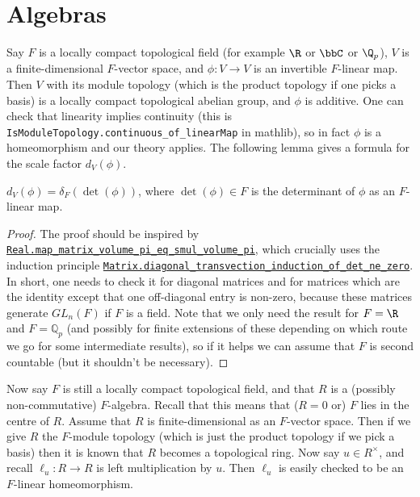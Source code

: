 \section{Algebras}

  Say $F$ is a locally compact topological field (for example $\R$ or $\bbC$ or $\Q_p$), $V$
  is a finite-dimensional $F$-vector space, and $\phi:V\to V$ is an invertible $F$-linear map.
  Then $V$ with its module topology (which is the product topology if one picks a basis)
  is a locally compact topological abelian group, and $\phi$ is additive.
  One can check that linearity implies continuity (this is {\tt IsModuleTopology.continuous\_of\_linearMap} in mathlib),
  so in fact $\phi$ is a homeomorphism
  and our theory applies. The following lemma gives a formula for the scale factor $d_V(\phi)$.

\begin{lemma}
  \label{MeasureTheory.addEquivAddHaarChar_eq_ringHaarChar_det}
  \leanok
  $d_V(\phi)=\delta_F(\det(\phi))$, where $\det(\phi)\in F$ is the determinant of $\phi$ as an $F$-linear map.
\end{lemma}
\begin{proof}
The proof should be inspired by \href{https://leanprover-community.github.io/mathlib4\_docs/Mathlib/MeasureTheory/Measure/Lebesgue/Basic.html\#Real.map\_matrix\_volume\_pi\_eq\_smul\_volume\_pi}{\tt Real.map\_matrix\_volume\_pi\_eq\_smul\_volume\_pi},
which crucially uses the induction principle \href{https://leanprover-community.github.io/mathlib4\_docs/Mathlib/LinearAlgebra/Matrix/Transvection.html\#Matrix.diagonal\_transvection\_induction\_of\_det\_ne\_zero}{\tt Matrix.diagonal\_transvection\_induction\_of\_det\_ne\_zero}.
In short, one needs to check it for diagonal matrices and for matrices which are the identity
except that one off-diagonal entry is non-zero, because these matrices generate $GL_n(F)$
if $F$ is a field. Note that we only need the result for $F=\R$
and $F=\mathbb{Q}_p$ (and possibly for finite extensions of these depending on which route
we go for some intermediate results), so if it helps we can assume that $F$ is second countable
(but it shouldn't be necessary).
\end{proof}

Now say $F$ is still a locally compact topological field, and that $R$ is a (possibly
non-commutative) $F$-algebra. Recall that this means that ($R=0$ or) $F$ lies in the centre of $R$.
Assume that $R$ is finite-dimensional as an $F$-vector space. Then if we give $R$ the
$F$-module topology (which is just the product topology if we pick a basis) then it is known
that $R$ becomes a topological ring. Now say $u\in R^\times$, and
recall $\ell_u:R\to R$ is left multiplication by $u$. Then $\ell_u$ is easily checked to be
an $F$-linear homeomorphism.

